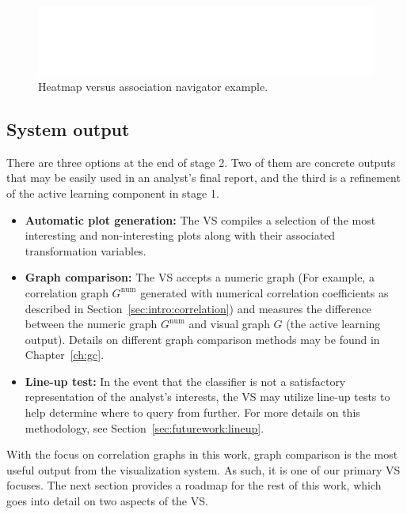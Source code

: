 \begin{figure}[htb]
	\begin{center}
		\includegraphics[width=1\linewidth]{ch-visualizer/figures/vs}
		\caption[Heatmap versus association navigator]{Heatmap versus 
		association navigator example.}
		\label{fig:visualizer:heatmap}
	\end{center}
\end{figure}

\subsection{System output}
\label{sec:visualizer:plotgeneration:output}

There are three options at the end of stage 2. Two of them are concrete outputs 
that may be easily used in an analyst's final report, and the third is a 
refinement of the active learning component in stage 1.

\tablespacing
\begin{itemize}
	\item \textbf{Automatic plot generation:} The VS compiles a selection of 
	the most interesting and non-interesting plots along with their 
	associated transformation variables.
	\item \textbf{Graph comparison:} The VS accepts a numeric graph (For 
	example, a correlation graph $G^{\text{num}}$ generated with numerical 
	correlation 
	coefficients as described in Section~\ref{sec:intro:correlation}) and 
	measures the difference between the numeric graph $G^{\text{num}}$ and 
	visual graph $G$ (the active learning output). 
	Details on different graph comparison methods may be found in 
	Chapter~\ref{ch:gc}.
	\item \textbf{Line-up test:} In the event that the classifier is not a 
	satisfactory representation of the analyst's interests, the VS may utilize 
	line-up tests to help determine where to query from further. For more 
	details on this methodology, see Section~\ref{sec:futurework:lineup}.
\end{itemize}
\bodyspacing

With the focus on correlation graphs in this work, graph comparison is the most 
useful output from the visualization system. As such, it is one of our primary 
VS focuses. The next section provides a roadmap for the rest of this work, 
which goes into detail on two aspects of the VS. 